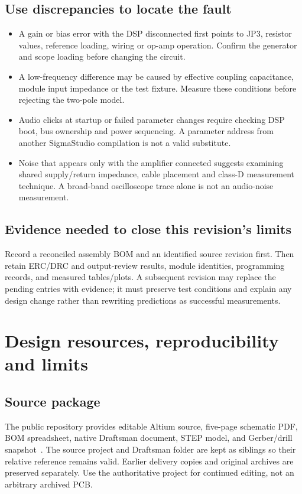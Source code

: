 \documentclass[a4paper,10pt]{article}
\newcommand{\nextsection}[1]{\clearpage\section{#1}}
\begin{document}
\subsection{Use discrepancies to locate the fault}
\begin{itemize}
\item A gain or bias error with the DSP disconnected first points to JP3, resistor values, reference loading, wiring or op-amp operation. Confirm the generator and scope loading before changing the circuit.
\item A low-frequency difference may be caused by effective coupling capacitance, module input impedance or the test fixture. Measure these conditions before rejecting the two-pole model.
\item Audio clicks at startup or failed parameter changes require checking DSP boot, bus ownership and power sequencing. A parameter address from another SigmaStudio compilation is not a valid substitute.
\item Noise that appears only with the amplifier connected suggests examining shared supply/return impedance, cable placement and class-D measurement technique. A broad-band oscilloscope trace alone is not an audio-noise measurement.
\end{itemize}

\subsection{Evidence needed to close this revision's limits}
Record a reconciled assembly BOM and an identified source revision first. Then retain ERC/DRC and output-review results, module identities, programming records, and measured tables/plots. A subsequent revision may replace the pending entries with evidence; it must preserve test conditions and explain any design change rather than rewriting predictions as successful measurements.

\nextsection{Design resources, reproducibility and limits}
\label{sec:resources}
\subsection{Source package}
The public repository provides editable Altium source, five-page schematic PDF, BOM spreadsheet, native Draftsman document, STEP model, and Gerber/drill snapshot~\cite{repo}. The source project and Draftsman folder are kept as siblings so their relative reference remains valid. Earlier delivery copies and original archives are preserved separately. Use the authoritative project for continued editing, not an arbitrary archived PCB.
\end{document}
